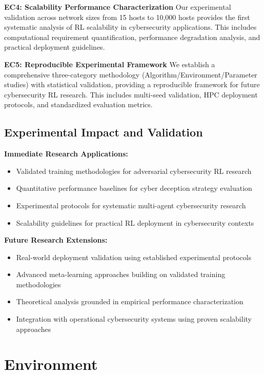 \documentclass[12pt,twoside]{article}
\theoremstyle{definition}
\theoremstyle{plain}
\begin{document}
\textbf{EC4: Scalability Performance Characterization}
Our experimental validation across network sizes from 15 hosts to 10,000 hosts provides the first systematic analysis of RL scalability in cybersecurity applications. This includes computational requirement quantification, performance degradation analysis, and practical deployment guidelines.

\textbf{EC5: Reproducible Experimental Framework}
We establish a comprehensive three-category methodology (Algorithm/Environment/Parameter studies) with statistical validation, providing a reproducible framework for future cybersecurity RL research. This includes multi-seed validation, HPC deployment protocols, and standardized evaluation metrics.

\subsection{Experimental Impact and Validation}

\textbf{Immediate Research Applications:}
\begin{itemize}
\item Validated training methodologies for adversarial cybersecurity RL research
\item Quantitative performance baselines for cyber deception strategy evaluation  
\item Experimental protocols for systematic multi-agent cybersecurity research
\item Scalability guidelines for practical RL deployment in cybersecurity contexts
\end{itemize}

\textbf{Future Research Extensions:}
\begin{itemize}
\item Real-world deployment validation using established experimental protocols
\item Advanced meta-learning approaches building on validated training methodologies
\item Theoretical analysis grounded in empirical performance characterization
\item Integration with operational cybersecurity systems using proven scalability approaches
\end{itemize}

\section{Environment}
\end{document}
